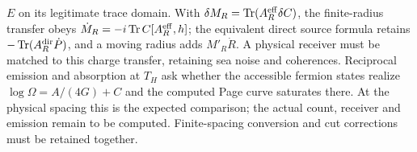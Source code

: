 $E$ on its legitimate trace domain. With
$\delta M_R=\operatorname{Tr}(A_R^{\rm eff}\delta C)$, the finite-radius transfer obeys
$\dot M_R=-i\operatorname{Tr}C[A_R^{\rm eff},h]$; the equivalent direct
source formula retains $-\operatorname{Tr}(A_R^{\rm dir}\dot P)$,
and a moving radius adds $M'_R\dot R$. A physical receiver must be matched
to this charge transfer, retaining sea noise and coherences.
Reciprocal emission and absorption at $T_H$ ask whether the accessible
fermion states realize $\log\Omega=A/(4G)+C$ and the computed Page curve
saturates there. At the physical spacing this is the expected comparison;
the actual count, receiver and emission remain to be computed.
Finite-spacing conversion and cut corrections must be retained together.

%
